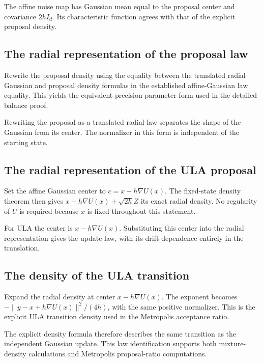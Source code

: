 \documentclass[11pt,a4paper]{article}
\begin{document}
The affine noise map has Gaussian mean equal to the proposal center and covariance \(2hI_d\). Its characteristic function agrees with that of the explicit proposal density.


\subsection{\texorpdfstring{The radial representation of the proposal law}{The radial representation of the proposal law}}


Rewrite the proposal density using the equality between the translated radial Gaussian and proposal density formulas in the established affine-Gaussian law equality. This yields the equivalent precision-parameter form used in the detailed-balance proof.



Rewriting the proposal as a translated radial law separates the shape of the Gaussian from its center. The normalizer in this form is independent of the starting state.


\subsection{\texorpdfstring{The radial representation of the ULA proposal}{The radial representation of the ULA proposal}}


Set the affine Gaussian center to \(c=x-h\nabla U(x)\). The fixed-state density theorem then gives \(x-h\nabla U(x)+\sqrt{2h}Z\) its exact radial density. No regularity of \(U\) is required because \(x\) is fixed throughout this statement.



For ULA the center is \(x-h\nabla U(x)\). Substituting this center into the radial representation gives the update law, with its drift dependence entirely in the translation.


\subsection{\texorpdfstring{The density of the ULA transition}{The density of the ULA transition}}


Expand the radial density at center \(x-h\nabla U(x)\). The exponent becomes \(-\|y-x+h\nabla U(x)\|^2/(4h)\), with the same positive normalizer. This is the explicit ULA transition density used in the Metropolis acceptance ratio.



The explicit density formula therefore describes the same transition as the independent Gaussian update. This law identification supports both mixture-density calculations and Metropolis proposal-ratio computations.
\end{document}
